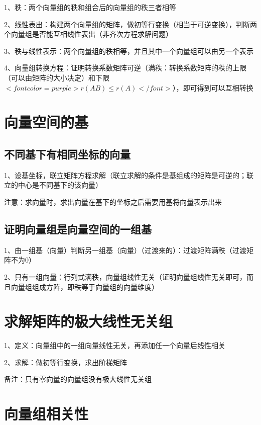 1、秩：两个向量组的秩和组合后的向量组的秩三者相等

2、线性表出：构建两个向量组的矩阵，做初等行变换（相当于可逆变换），判断两个向量组是否能互相线性表出（非齐次方程求解问题）

3、秩与线性表示：两个向量组的秩相等，并且其中一个向量组可以由另一个表示 

4、向量组转换方程：证明转换系数矩阵可逆（满秩：转换系数矩阵的秩的上限（可以由矩阵的大小决定）和下限$ <font color=purple>r(AB) \le r(A)</font> $），即可得到可以互相转换

\section{向量空间的基}



\subsection{不同基下有相同坐标的向量}

1、设基坐标，联立矩阵方程求解（联立求解的条件是基组成的矩阵是可逆的；联立的中心是不同基下的该向量）

注意：求向量时，求出向量在基下的坐标之后需要用基将向量表示出来



\subsection{证明向量组是向量空间的一组基}

1、由一组基（向量）判断另一组基（向量）（过渡来的）：过渡矩阵满秩（过渡矩阵不为0）

2、只有一组向量：行列式满秩，向量组线性无关（证明向量组线性无关即可，而且向量组组成方阵，即秩等于向量组的向量维度）

\section{求解矩阵的极大线性无关组}

1、定义：向量组中的一组向量线性无关，再添加任一个向量后线性相关

2、求解：做初等行变换，求出阶梯矩阵

备注：只有零向量的向量组没有极大线性无关组

\section{向量组相关性}



